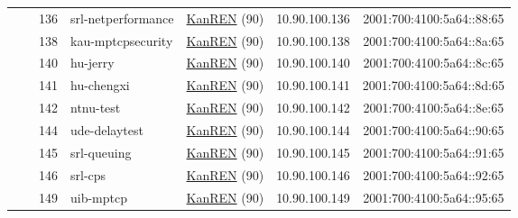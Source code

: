 \begin{small}
\begin{center}
\begin{longtable}{|c|c|c|c|c|c|c|c|}
  &  & \tiny{136} & \multicolumn{1}{|l|}{\tiny{srl-netperformance}} & \multicolumn{2}{|c|}{\tiny{\href{http://www.kanren.net}{KanREN} (90)}} & \tiny{10.90.100.136} & \tiny{2001:700:4100:5a64::88:65} \\* \cline{3-3}\cline{4-4}\cline{5-5}\cline{6-6}\cline{7-7}\cline{8-8}
  &  & \tiny{138} & \multicolumn{1}{|l|}{\tiny{kau-mptcpsecurity}} & \multicolumn{2}{|c|}{\tiny{\href{http://www.kanren.net}{KanREN} (90)}} & \tiny{10.90.100.138} & \tiny{2001:700:4100:5a64::8a:65} \\* \cline{3-3}\cline{4-4}\cline{5-5}\cline{6-6}\cline{7-7}\cline{8-8}
  &  & \tiny{140} & \multicolumn{1}{|l|}{\tiny{hu-jerry}} & \multicolumn{2}{|c|}{\tiny{\href{http://www.kanren.net}{KanREN} (90)}} & \tiny{10.90.100.140} & \tiny{2001:700:4100:5a64::8c:65} \\* \cline{3-3}\cline{4-4}\cline{5-5}\cline{6-6}\cline{7-7}\cline{8-8}
  &  & \tiny{141} & \multicolumn{1}{|l|}{\tiny{hu-chengxi}} & \multicolumn{2}{|c|}{\tiny{\href{http://www.kanren.net}{KanREN} (90)}} & \tiny{10.90.100.141} & \tiny{2001:700:4100:5a64::8d:65} \\* \cline{3-3}\cline{4-4}\cline{5-5}\cline{6-6}\cline{7-7}\cline{8-8}
  &  & \tiny{142} & \multicolumn{1}{|l|}{\tiny{ntnu-test}} & \multicolumn{2}{|c|}{\tiny{\href{http://www.kanren.net}{KanREN} (90)}} & \tiny{10.90.100.142} & \tiny{2001:700:4100:5a64::8e:65} \\* \cline{3-3}\cline{4-4}\cline{5-5}\cline{6-6}\cline{7-7}\cline{8-8}
  &  & \tiny{144} & \multicolumn{1}{|l|}{\tiny{ude-delaytest}} & \multicolumn{2}{|c|}{\tiny{\href{http://www.kanren.net}{KanREN} (90)}} & \tiny{10.90.100.144} & \tiny{2001:700:4100:5a64::90:65} \\* \cline{3-3}\cline{4-4}\cline{5-5}\cline{6-6}\cline{7-7}\cline{8-8}
  &  & \tiny{145} & \multicolumn{1}{|l|}{\tiny{srl-queuing}} & \multicolumn{2}{|c|}{\tiny{\href{http://www.kanren.net}{KanREN} (90)}} & \tiny{10.90.100.145} & \tiny{2001:700:4100:5a64::91:65} \\* \cline{3-3}\cline{4-4}\cline{5-5}\cline{6-6}\cline{7-7}\cline{8-8}
  &  & \tiny{146} & \multicolumn{1}{|l|}{\tiny{srl-cps}} & \multicolumn{2}{|c|}{\tiny{\href{http://www.kanren.net}{KanREN} (90)}} & \tiny{10.90.100.146} & \tiny{2001:700:4100:5a64::92:65} \\* \cline{3-3}\cline{4-4}\cline{5-5}\cline{6-6}\cline{7-7}\cline{8-8}
  &  & \tiny{149} & \multicolumn{1}{|l|}{\tiny{uib-mptcp}} & \multicolumn{2}{|c|}{\tiny{\href{http://www.kanren.net}{KanREN} (90)}} & \tiny{10.90.100.149} & \tiny{2001:700:4100:5a64::95:65} \\* \cline{3-3}\cline{4-4}\cline{5-5}\cline{6-6}\cline{7-7}\cline{8-8}

\end{longtable}
\end{center}
\end{small}
